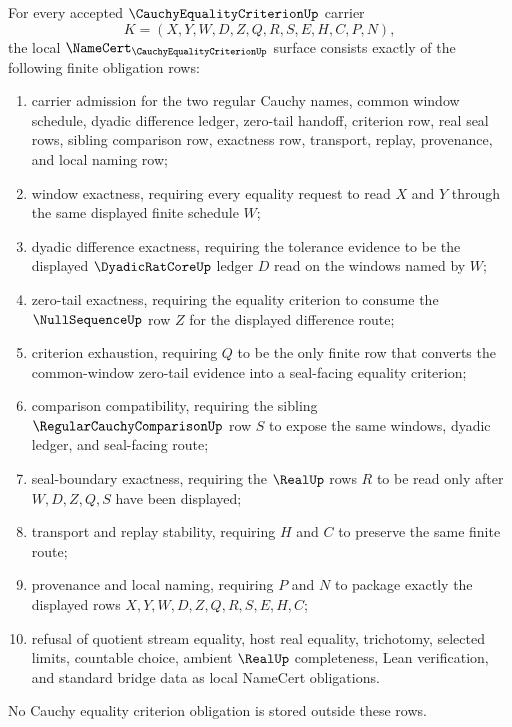 \begin{theorem}
\label{thm:cauchy-equality-criterion-namecert-obligations}
For every accepted $\CauchyEqualityCriterionUp$ carrier
$$
K=(X,Y,W,D,Z,Q,R,S,E,H,C,P,N),
$$
the local $\NameCert_{\CauchyEqualityCriterionUp}$ surface consists exactly of the following finite obligation rows:
\begin{enumerate}
\item carrier admission for the two regular Cauchy names, common window schedule, dyadic difference ledger, zero-tail handoff, criterion row, real seal rows, sibling comparison row, exactness row, transport, replay, provenance, and local naming row;
\item window exactness, requiring every equality request to read $X$ and $Y$ through the same displayed finite schedule $W$;
\item dyadic difference exactness, requiring the tolerance evidence to be the displayed $\DyadicRatCoreUp$ ledger $D$ read on the windows named by $W$;
\item zero-tail exactness, requiring the equality criterion to consume the $\NullSequenceUp$ row $Z$ for the displayed difference route;
\item criterion exhaustion, requiring $Q$ to be the only finite row that converts the common-window zero-tail evidence into a seal-facing equality criterion;
\item comparison compatibility, requiring the sibling $\RegularCauchyComparisonUp$ row $S$ to expose the same windows, dyadic ledger, and seal-facing route;
\item seal-boundary exactness, requiring the $\RealUp$ rows $R$ to be read only after $W,D,Z,Q,S$ have been displayed;
\item transport and replay stability, requiring $H$ and $C$ to preserve the same finite route;
\item provenance and local naming, requiring $P$ and $N$ to package exactly the displayed rows $X,Y,W,D,Z,Q,R,S,E,H,C$;
\item refusal of quotient stream equality, host real equality, trichotomy, selected limits, countable choice, ambient $\RealUp$ completeness, Lean verification, and standard bridge data as local NameCert obligations.
\end{enumerate}
No Cauchy equality criterion obligation is stored outside these rows.
\end{theorem}

